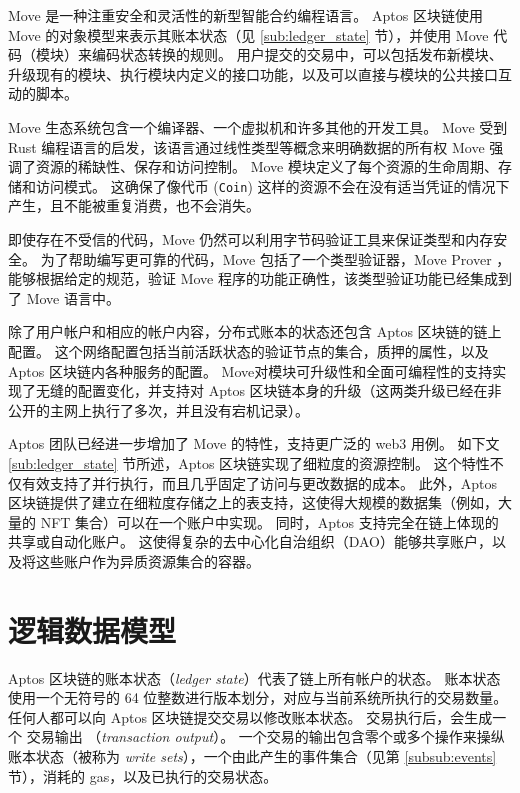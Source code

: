 \documentclass{article}
\begin{document}
Move 是一种注重安全和灵活性的新型智能合约编程语言。 Aptos 区块链使用 Move 的对象模型来表示其账本状态（见 \ref{sub:ledger_state} 节），并使用 Move 代码（模块）来编码状态转换的规则。 用户提交的交易中，可以包括发布新模块、升级现有的模块、执行模块内定义的接口功能，以及可以直接与模块的公共接口互动的脚本。

Move 生态系统包含一个编译器、一个虚拟机和许多其他的开发工具。 Move 受到 Rust 编程语言的启发，该语言通过线性类型等概念来明确数据的所有权 Move 强调了资源的稀缺性、保存和访问控制。 Move 模块定义了每个资源的生命周期、存储和访问模式。 这确保了像代币 (\texttt{Coin}) 这样的资源不会在没有适当凭证的情况下产生，且不能被重复消费，也不会消失。

即使存在不受信的代码，Move 仍然可以利用字节码验证工具来保证类型和内存安全。 为了帮助编写更可靠的代码，Move 包括了一个类型验证器，Move Prover \cite{move_prover}，能够根据给定的规范，验证 Move 程序的功能正确性，该类型验证功能已经集成到了 Move 语言中。

除了用户帐户和相应的帐户内容，分布式账本的状态还包含 Aptos 区块链的链上配置。 这个网络配置包括当前活跃状态的验证节点的集合，质押的属性，以及 Aptos 区块链内各种服务的配置。 Move对模块可升级性和全面可编程性的支持实现了无缝的配置变化，并支持对 Aptos 区块链本身的升级（这两类升级已经在非公开的主网上执行了多次，并且没有宕机记录）。

Aptos 团队已经进一步增加了 Move 的特性，支持更广泛的 web3 用例。 如下文 \ref{sub:ledger_state} 节所述，Aptos 区块链实现了细粒度的资源控制。 这个特性不仅有效支持了并行执行，而且几乎固定了访问与更改数据的成本。 此外，Aptos 区块链提供了建立在细粒度存储之上的表支持，这使得大规模的数据集（例如，大量的 NFT 集合）可以在一个账户中实现。 同时，Aptos 支持完全在链上体现的共享或自动化账户。 这使得复杂的去中心化自治组织（DAO）能够共享账户，以及将这些账户作为异质资源集合的容器。

\section{逻辑数据模型}
\label{sec:logical}

Aptos 区块链的账本状态（\emph{ledger state}）代表了链上所有帐户的状态。 账本状态使用一个无符号的 64 位整数进行版本划分，对应与当前系统所执行的交易数量。 任何人都可以向 Aptos 区块链提交交易以修改账本状态。 交易执行后，会生成一个 交易输出 （\emph{transaction output}）。 一个交易的输出包含零个或多个操作来操纵账本状态（被称为 \emph{write sets}），一个由此产生的事件集合（见第 \ref{subsub:events} 节），消耗的 gas，以及已执行的交易状态。
\end{document}
